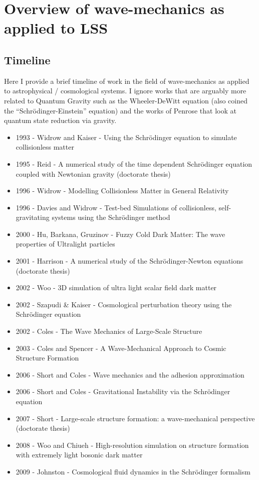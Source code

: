 \section{Overview of wave-mechanics as applied to LSS}

\subsection{Timeline}
Here I provide a brief timeline of work in the field of wave-mechanics as applied to astrophysical / cosmological systems. I ignore works that are arguably more related to Quantum Gravity such as the Wheeler-DeWitt equation (also coined the ``Schr\"odinger-Einstein'' equation) and the works of Penrose that look at quantum state reduction via gravity.

\begin{itemize}
\item 1993 - Widrow and Kaiser - Using the Schr\"odinger equation to simulate collisionless matter
\item 1995 - Reid - A numerical study of the time dependent Schr\"odinger equation coupled with Newtonian gravity (doctorate thesis)
\item 1996 - Widrow - Modelling Collisionless Matter in General Relativity
\item 1996 - Davies and Widrow - Test-bed Simulations of collisionless, self-gravitating systems using the Schr\"odinger method
\item 2000 - Hu, Barkana, Gruzinov - Fuzzy Cold Dark Matter: The wave properties of Ultralight particles
\item 2001 - Harrison - A numerical study of the Schr\"odinger-Newton equations (doctorate thesis)
\item 2002 - Woo - 3D simulation of ultra light scalar field dark matter
\item 2002 - Szapudi \& Kaiser - Cosmological perturbation theory using the Schr\"odinger equation
\item 2002 - Coles - The Wave Mechanics of Large-Scale Structure
\item 2003 - Coles and Spencer - A Wave-Mechanical Approach to Cosmic Structure Formation
\item 2006 - Short and Coles - Wave mechanics and the adhesion approximation
\item 2006 - Short and Coles - Gravitational Instability via the Schr\"odinger equation
\item 2007 - Short - Large-scale structure formation: a wave-mechanical perspective (doctorate thesis)
\item 2008 - Woo and Chiueh - High-resolution simulation on structure formation with extremely light bosonic dark matter
\item 2009 - Johnston - Cosmological fluid dynamics in the Schr\"odinger formalism
\end{itemize}

